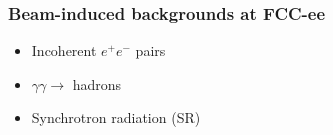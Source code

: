 \documentclass[hyperref={colorlinks=true,pdfpagelabels=false,linkcolor=black}, xcolor=dvipsnames,10pt]{beamer}
\begin{document}
\begin{frame}
\end{frame}

\begin{frame}
	\frametitle{Beam-induced backgrounds at FCC-ee}

  \begin{itemize}
    \item Incoherent $e^+e^-$ pairs
    \item $\gamma\gamma\rightarrow$ hadrons
    \item Synchrotron radiation (SR)
  \end{itemize}

\end{frame}

\end{document}
